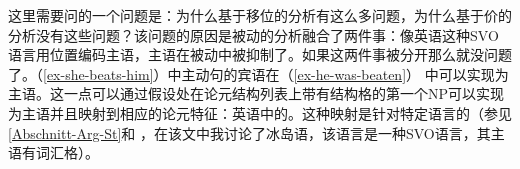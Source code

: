 
这里需要问的一个问题是：为什么基于移位的分析有这么多问题，为什么基于价的分析没有这些问题？该问题的原因是被动的分析融合了两件事：像英语这种SVO语言用位置编码主语，主语在被动中被抑制了。如果这两件事被分开那么就没问题了。（\ref{ex-she-beats-him}）中主动句的宾语在（\ref{ex-he-was-beaten}） 中可以实现为主语。这一点可以通过假设处在论元结构列表上带有结构格的第一个NP可以实现为主语并且映射到相应的论元特征：英语中的\sprc。这种映射是针对特定语言的（参见\ref{Abschnitt-Arg-St}和 ，在该文中我讨论了冰岛语，该语言是一种SVO语言，其主语有词汇格）。

